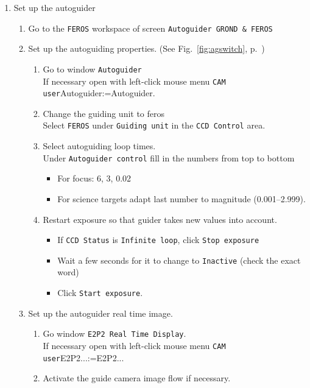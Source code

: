\documentclass[11pt,fleqn]{book}
\makeatletter
\def\menu#1#2{\texttt{#1}\ifx{}#2\else\@for\@x:=#2\do{$\rightarrow$\texttt{\@x}}\fi}
\def\mmenu#1#2{left-click mouse menu \menu{#1}{#2}}
\def\figref#1{Fig.~\ref{fig:#1}, p.~\pageref{fig:#1}}
\makeatother
\begin{document}
\begin{enumerate}
\begin{enumerate}
  \end{enumerate}
  \item Set up the autoguider\label{list:autoguiderFeros} 
  \begin{enumerate}
    \item Go to the \texttt{FEROS} workspace of screen \texttt{Autoguider GROND \& FEROS}
    \item Set up the autoguiding properties. (See \figref{agswitch})
    \begin{enumerate}
      \item Go to window \texttt{Autoguider}\\
            If necessary open with \mmenu{CAM user}{Autoguider}.
      \item Change the guiding unit to \gls{feros}\\
            Select \texttt{FEROS} under \texttt{Guiding unit} in the \texttt{CCD Control} area. 
      \item Select autoguiding loop times.\\
            Under \texttt{Autoguider control} fill in the numbers from top to bottom
      \begin{itemize}
        \item For focus: 6, 3, 0.02
        \item For science targets adapt last number to magnitude (0.001--2.999).
      \end{itemize}
      \item Restart exposure so that guider takes new values into account.
      \begin{itemize}
        \item If \texttt{CCD Status} is \texttt{Infinite loop}, click \texttt{Stop exposure}
        \item Wait a few seconds for it to change to \texttt{Inactive} (check the exact word)%
        \item Click \texttt{Start exposure}.
      \end{itemize}
    \end{enumerate}
    \item Set up the autoguider real time image.
    \begin{enumerate}
      \item Go window \texttt{E2P2 Real Time Display}.\\
            If necessary open with \mmenu{CAM user}{E2P2...} 
      \item Activate the guide camera image flow if necessary.\\

\end{enumerate}
\end{enumerate}
\end{enumerate}
\end{document}
